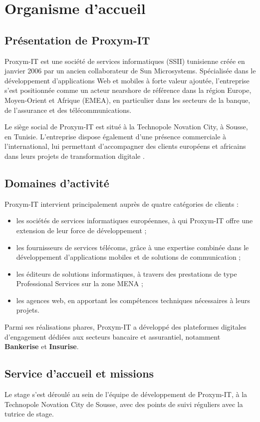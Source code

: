 \documentclass[12pt,a4paper]{report}
\begin{document}
\section{Organisme d'accueil}

\subsection{Présentation de Proxym-IT}
Proxym-IT est une société de services informatiques (SSII) tunisienne créée en janvier 2006 par un ancien collaborateur de Sun Microsystems. Spécialisée dans le développement d'applications Web et mobiles à forte valeur ajoutée, l'entreprise s'est positionnée comme un acteur nearshore de référence dans la région Europe, Moyen-Orient et Afrique (EMEA), en particulier dans les secteurs de la banque, de l'assurance et des télécommunications.

Le siège social de Proxym-IT est situé à la Technopole Novation City, à Sousse, en Tunisie. L'entreprise dispose également d'une présence commerciale à l'international, lui permettant d'accompagner des clients européens et africains dans leurs projets de transformation digitale \cite{proxym}.

\subsection{Domaines d'activité}
Proxym-IT intervient principalement auprès de quatre catégories de clients :
\begin{itemize}
  \item les sociétés de services informatiques européennes, à qui Proxym-IT offre une extension de leur force de développement ;
  \item les fournisseurs de services télécoms, grâce à une expertise combinée dans le développement d'applications mobiles et de solutions de communication ;
  \item les éditeurs de solutions informatiques, à travers des prestations de type \og Professional Services\fg{} sur la zone MENA ;
  \item les agences web, en apportant les compétences techniques nécessaires à leurs projets.
\end{itemize}
Parmi ses réalisations phares, Proxym-IT a développé des plateformes digitales d'engagement dédiées aux secteurs bancaire et assurantiel, notamment \textbf{Bankerise} et \textbf{Insurise}.

\subsection{Service d'accueil et missions}
Le stage s'est déroulé au sein de l'équipe de développement de Proxym-IT, à la Technopole Novation City de Sousse, avec des points de suivi réguliers avec la tutrice de stage.
\end{document}

